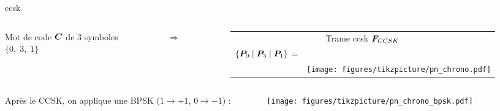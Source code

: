 \documentclass[../main.tex]{subfiles}
\begin{document}
\begin{frame}{\acrfull{ccsk}}
  \vspace{1 em}

  \begin{columns}
    \begin{column}{.35\linewidth}
      \begin{overlayarea}{\linewidth}{.19 \textheight}
        \centering
        Mot de code $\bm{C}$ de $3$ symboles\\
        $\{ 0, \; 3, \; 1\}$
      \end{overlayarea}
    \end{column}
    \begin{column}{.05\linewidth}
      \centering
      $\Rightarrow$
    \end{column}
    \begin{column}{.6\linewidth}
      \begin{overlayarea}{\linewidth}{.19 \textheight}
        \centering
        \begin{tabular}{@{}r c@{}}
          \multicolumn{2}{c}{Trame \acrshort{ccsk} $\bm{F}_{CCSK}$}          \\
          $\{ \bm{P}_{0} \;|\; \bm{P}_{3} \;|\; \bm{P}_{1} \}$ = 
            & {\large \Ob{}\Xb{}\Xb{}\Xb{}~~\Xb{}\Xb{}\Xb{}\Ob{}~~\Xb{}\Ob{}\Xb{}\Xb{}} \\
            & \texttt{[image: figures/tikzpicture/pn\_chrono.pdf]}
        \end{tabular}
      \end{overlayarea}
    \end{column}
  \end{columns}
  \begin{columns}
    \begin{column}{.6678\linewidth}
      Après le CCSK, on applique une BPSK ($1 \rightarrow +1$, $0 \rightarrow -1$) :
    \end{column}
    \begin{column}{.2322\linewidth} \centering
      \texttt{[image: figures/tikzpicture/pn\_chrono\_bpsk.pdf]}
    \end{column}
    \begin{column}{.055\linewidth}
    \end{column}
  \end{columns}
\end{frame}
\end{document}
